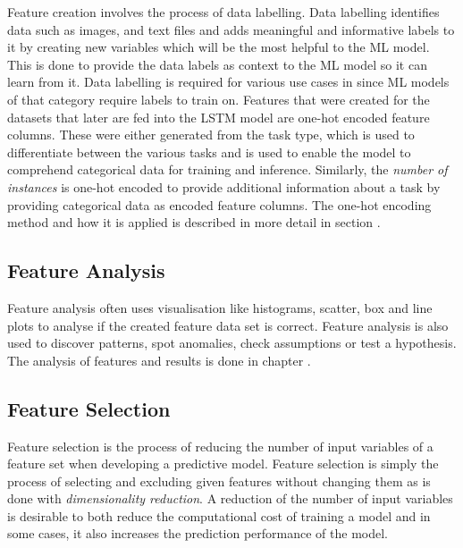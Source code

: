       Feature creation involves the process of data labelling.
      Data labelling identifies data such as images, and text files and adds meaningful and informative labels to it by creating new variables which will be the most helpful to the ML model. This is done to provide the data labels as context to the ML model so it can learn from it. Data labelling is required for various use cases in  since ML models of that category require labels to train on. Features that were created for the datasets that later are fed into the LSTM model are one-hot encoded feature columns. These were either generated from the task type, which is used to differentiate between the various tasks and is used to enable the model to comprehend categorical data for training and inference. Similarly, the \emph{number of instances} is one-hot encoded to provide additional information about a task by providing categorical data as encoded feature columns. The one-hot encoding method and how it is applied is described in more detail in section .

    \subsection{Feature Analysis}
    \label{sec:feature-analysis-preprocessing-architecture}
    
      Feature analysis often uses visualisation like histograms, scatter, box and line plots to analyse if the created feature data set is correct. Feature analysis is also used to discover patterns, spot anomalies, check assumptions or test a hypothesis.
      The analysis of features and results is done in chapter .

    \subsection{Feature Selection}
    \label{sec:feature-selection-data-preprocessing-architecture}

      Feature selection is the process of reducing the number of input variables of a feature set when developing a predictive model.
      Feature selection is simply the process of selecting and excluding given features without changing them as is done with \emph{dimensionality reduction}.
      A reduction of the number of input variables is desirable to both reduce the computational cost of training a model and in some cases, it also increases the prediction performance of the model.

